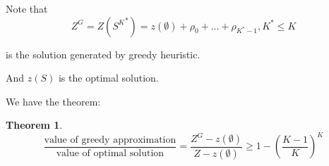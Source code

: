 \documentclass{article}
\newtheorem{theorem}{Theorem}
\begin{document}
\par Note that
\begin{equation}
Z^G=Z({S^K}^*)=z(\emptyset)+\rho_0 + ... +\rho_{K^*-1}, K^*\leq K
\label{Z^G}
\end{equation}
\par is the solution generated by greedy heuristic. \par And $z(S)$ is the optimal solution.
\par We have the theorem:
\begin{theorem}
    \begin{equation}
\frac{\text{value of greedy approximation}}{\text{value of optimal solution}}=\frac{Z^G-z(\emptyset)}{Z-z(\emptyset)}\geq 1-{(\frac{K-1}{K})}^K
\label{theorem1}
    \end{equation}
\end{theorem}
\end{document}
